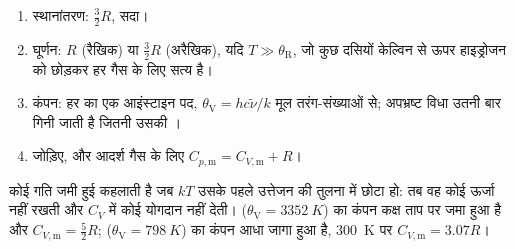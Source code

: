 \begin{method}[विधाओं से किसी गैस की ऊष्मा धारिता]\label{met:b3:statistical-thermo-applied:cv}
\begin{enumerate}
  \item स्थानांतरण: $\frac32R$, सदा।
  \item घूर्णन: $R$ (रैखिक) या $\frac32R$ (अरैखिक), यदि $T \gg \theta_{\mathrm R}$, जो
        कुछ दसियों केल्विन से ऊपर हाइड्रोजन को छोड़कर हर गैस के लिए सत्य है।
  \item कंपन: हर  का एक आइंस्टाइन पद, $\theta_{\mathrm V} = hc\tilde\nu/k$
        मूल तरंग-संख्याओं से; अपभ्रष्ट विधा उतनी बार गिनी जाती है जितनी
        उसकी ।
  \item जोड़िए, और आदर्श गैस के लिए $C_{p,\mathrm m} = C_{V,\mathrm m} + R$।
\end{enumerate}
\end{method}

कोई गति जमी हुई कहलाती है जब $kT$ उसके पहले उत्तेजन की तुलना में छोटा हो:
तब वह कोई ऊर्जा नहीं रखती और $C_V$ में कोई योगदान नहीं देती।
 ($\theta_{\mathrm V} = \qty{3352}{K}$) का कंपन कक्ष ताप पर जमा हुआ है और
$C_{V,\mathrm m} = \frac52R$;  ($\theta_{\mathrm V} = \qty{798}{K}$) का कंपन आधा जागा हुआ है,
\qty{300}{K} पर $C_{V,\mathrm m} = 3.07R$।

